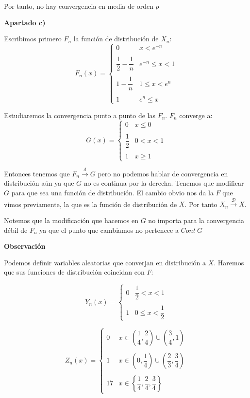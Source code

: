 \documentclass[openany]{book}
\begin{document}
\begin{exercise}
    Por tanto, no hay convergencia en media de orden $ p $

    \begin{flushright}
        \textbf{Apartado c)}
    \end{flushright}
    Escribimos primero $ F_n $ la función de distribución de $ X_n $:
    $$ F_n(x) = \left\{
    \begin{array}{ll}
        0 & x<e^{-n}\\ \\ 
        \dfrac{1}{2}-\dfrac{1}{n} & e^{-n}\leq  x <1\\\\ 
        1-\dfrac{1}{n} & 1\leq x<e^{n}\\\\ 
        1 & e^{n}\leq  x 
    \end{array}
    \right. $$

    Estudiaremos la convergencia punto a punto de las $ F_n $. $ F_n $ converge a:
    $$G(x) =  \left\{
    \begin{array}{ll}
        0 & x\leq  0\\ \\
        \dfrac{1}{2} & 0<x<1\\ \\
        1 & x\geq 1

    \end{array}
    \right. $$

    Entonces tenemos que $ F_n\xrightarrow{d}G $ pero no podemos hablar de convergencia en distribución aún ya que $ G $ no es continua por la derecha. Tenemos que modificar $ G $ para que sea una función de distribución. El cambio obvio nos da la $ F $ que vimos previamente, la que es la función de distribución de $ X $. Por tanto $ X_n \xrightarrow{\mathcal{D}}X $.

    Notemos que la modificación que hacemos en $ G $ no importa para la convergencia débil de $ F_n $ ya que el punto que cambiamos no pertenece a $Cont\ G $


    \textbf{Observación}

    Podemos definir variables aleatorias que converjan en distribución a $ X $. Haremos que sus funciones de distribución coincidan con $ F $:

    $$ Y_n(x) = \left\{
    \begin{array}{ll}
        0 & \dfrac{1}{2} <x<1 \\ \\ 
        1 & 0 \leq x < \dfrac{1}{2}
    \end{array}
    \right. $$

    $$ Z_n(x) = \left\{
    \begin{array}{ll}
        0 & x \in \left(\dfrac{1}{4},\dfrac{2}{4}\right) \cup \left(\dfrac{3}{4},1\right)\\ \\ 
        1 & x \in \left(0,\dfrac{1}{4}\right) \cup \left(\dfrac{2}{3},\dfrac{3}{4}\right)\\ \\ 
        17 & x \in \left\{\dfrac{1}{4},\dfrac{2}{4},\dfrac{3}{4}\right\}
    \end{array}
    \right. $$

\end{exercise}
\end{document}
